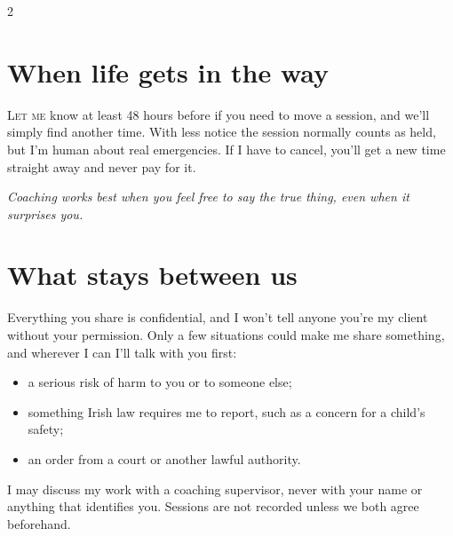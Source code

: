 \documentclass[9pt]{extarticle}
\newcommand{\initial}[2]{\lettrine[lines=2, loversize=.08, lraise=.02]{#1}{#2}}
\newcommand{\aside}[1]{\begin{asidebox}\display\itshape\fontsize{12.5}{16}\selectfont\color{goldlight}#1\end{asidebox}}
\begin{document}
\begin{multicols}{2}
\section{When life gets in the way}
\initial{L}{et me} know at least 48 hours before if you need to move a session, and we'll simply find another time. With less notice the session normally counts as held, but I'm human about real emergencies. If I have to cancel, you'll get a new time straight away and never pay for it.

\aside{Coaching works best when you feel free to say the true thing, even when it surprises you.}

\section{What stays between us}
Everything you share is confidential, and I won't tell anyone you're my client without your permission. Only a few situations could make me share something, and wherever I can I'll talk with you first:
\begin{itemize}
  \item a serious risk of harm to you or to someone else;
  \item something Irish law requires me to report, such as a concern for a child's safety;
  \item an order from a court or another lawful authority.
\end{itemize}
I may discuss my work with a coaching supervisor, never with your name or anything that identifies you. Sessions are not recorded unless we both agree beforehand.

\end{multicols}
\end{document}
